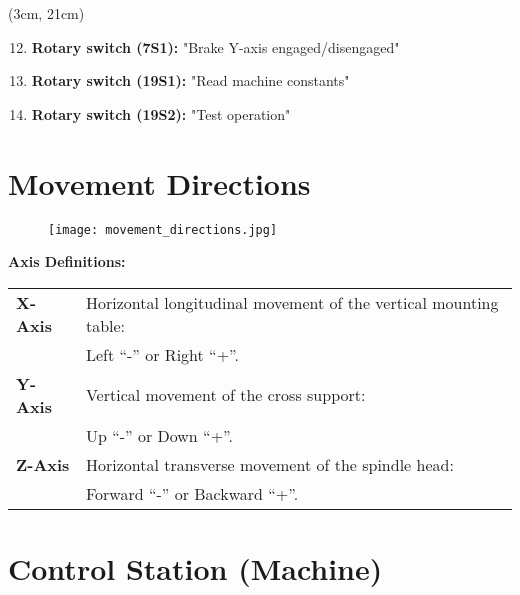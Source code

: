 \begin{textblock*}{\textwidth}(3cm, 21cm)  %
    \begin{enumerate}[itemsep=1pt,parsep=0pt]
        \setcounter{enumi}{11}
        \item \textbf{Rotary switch (7S1):} "Brake Y-axis engaged/disengaged"
        \item \textbf{Rotary switch (19S1):} "Read machine constants"
        \item \textbf{Rotary switch (19S2):} "Test operation"
    \end{enumerate}
\end{textblock*}

\vspace{2cm}


\section{Movement Directions}

\begin{figure}[h]
    \centering
    \texttt{[image: movement\_directions.jpg]}
\end{figure}

\vspace{0.5cm}

\noindent \textbf{Axis Definitions:}

\vspace{0.3cm}

\noindent \begin{tabular}{ l l }
\textbf{X-Axis} & Horizontal longitudinal movement of the vertical mounting table: \\
                & Left \enquote{-} or Right \enquote{+}. \\
\textbf{Y-Axis} & Vertical movement of the cross support: \\
                & Up \enquote{-} or Down \enquote{+}. \\
\textbf{Z-Axis} & Horizontal transverse movement of the spindle head: \\
                & Forward \enquote{-} or Backward \enquote{+}. \\
\end{tabular}

\section{Control Station (Machine)}

